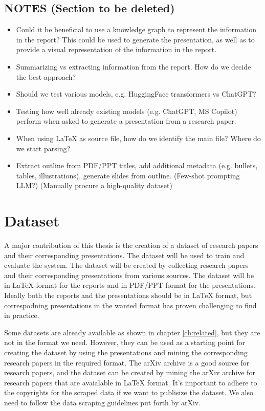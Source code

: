 %
\subsection{NOTES (Section to be deleted)}
\begin{itemize}
    \item Could it be beneficial to use a knowledge graph to represent the information in the report? This could be used to generate the presentation, as well as to provide a visual representation of the information in the report.
    \item Summarizing vs extracting information from the report. How do we decide the best approach?
    \item Should we test various models, e.g. HuggingFace transformers vs ChatGPT?
    \item Testing how well already existing models (e.g. ChatGPT, MS Copilot) perform when asked to generate a presentation from a research paper.
    \item When using \LaTeX{} as source file, how do we identify the main file? Where do we start parsing? 
    \item Extract outline from PDF/PPT titles, add additional metadata (e.g. bullets, tables, illustrations), generate slides from outline. (Few-shot prompting LLM?) (Manually procure a high-quality dataset)
\end{itemize}

\section{Dataset}

A major contribution of this thesis is the creation of a dataset of research papers and their corresponding presentations. The dataset will be used to train and evaluate the system. The dataset will be created by collecting research papers and their corresponding presentations from various sources. The dataset will be in \LaTeX{} format for the reports and in PDF/PPT format for the presentations. Ideally both the reports and the presentations should be in \LaTeX{} format, but correspodning presentations in the wanted format has proven challenging to find in practice. 

Some datasets are already available as shown in chapter \ref{ch:related}, but they are not in the format we need. However, they can be used as a starting point for creating the dataset by using the presentations and mining the corresponding research papers in the required format. The arXiv archive is a good source for research papers, and the dataset can be created by mining the arXiv archive for research papers that are avaialable in \LaTeX{} format. It's important to adhere to the copyrights for the scraped data if we want to publisize the dataset. We also need to follow the data scraping guidelines put forth by arXiv.

